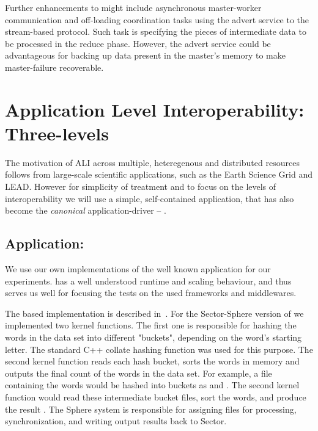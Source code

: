 \documentclass[3p,twocolumn]{elsarticle}
\begin{document}
Further enhancements to \sagamapreduce might include asynchronous master-worker
communication and off-loading coordination tasks using the advert service to
the stream-based protocol.
Such task is specifying the pieces of intermediate data to be processed
in the reduce phase. However, the advert service could be advantageous for
backing up data present in the master's memory to make master-failure
recoverable.


\section{Application Level Interoperability: Three-levels}
\label{sec:interop}

The motivation of ALI across multiple, heteregenous and distributed
resources follows from large-scale scientific applications, such as
the Earth Science Grid and LEAD. However for simplicity of treatment
and to focus on the levels of interoperability we will use a simple,
self-contained application, that has also become the {\it canonical}
\mr application-driver -- \wc.

\subsection{Application: \Wc}
\label{ssec:app}

We use our own implementations of the well known \wc application for
our experiments.  \Wc has a well understood runtime and scaling
behaviour, and thus serves us well for focusing the tests on the used
frameworks and middlewares.

The \mr based \wc implementation is described in~\cite{saga_ccgrid09}.
For the Sector-Sphere version of \wc we implemented two kernel
functions. The first one is responsible for hashing the
words in the data set into different "buckets", depending on
the word's starting letter.  The standard C++ collate hashing function
was used for this purpose.  The second kernel function reads each hash
bucket, sorts the words in memory and outputs the final count of
the words in the data set.  For example, a file containing the words
 would be hashed into buckets as
 and .  The second kernel
function would read these intermediate bucket files, sort the words,
and produce the result .  The Sphere system is responsible for assigning files for
processing, synchronization, and writing output results back to
Sector.
\end{document}

